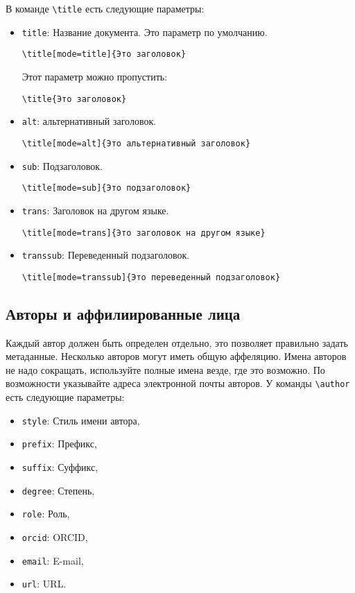 \documentclass[
12pt,
polyglossia,   %
firacode,    %
wordmath,      %
russian        %
]{isdctart}
\begin{document}
В команде \verb|\title| есть следующие параметры:
\begin{itemize}
\item \verb|title|: Название документа. Это параметр по умолчанию.
\begin{verbatim}
\title[mode=title]{Это заголовок}
\end{verbatim}
Этот параметр можно пропустить:
\begin{verbatim}
\title{Это заголовок}
\end{verbatim}
\item \verb|alt|: альтернативный заголовок.
\begin{verbatim}
\title[mode=alt]{Это альтернативный заголовок}
\end{verbatim}
\item \verb|sub|: Подзаголовок.
\begin{verbatim}
\title[mode=sub]{Это подзаголовок}
\end{verbatim}
\item \verb|trans|: Заголовок на другом языке.
\begin{verbatim}
\title[mode=trans]{Это заголовок на другом языке}
\end{verbatim}
\item \verb|transsub|: Переведенный подзаголовок.
\begin{verbatim}
\title[mode=transsub]{Это переведенный подзаголовок}
\end{verbatim}
\end{itemize}

\subsection{Авторы и аффилиированные лица}

Каждый автор должен быть определен отдельно, это позволяет правильно задать метаданные. Несколько авторов могут иметь общую аффеляцию. Имена авторов не надо сокращать, используйте полные имена везде, где это возможно. По возможности указывайте адреса электронной почты авторов.  У команды \verb|\author| есть следующие параметры:

\begin{itemize}
\item \verb|style|: Стиль имени автора,
\item \verb|prefix|: Префикс,
\item \verb|suffix|: Суффикс,
\item \verb|degree|: Степень,
\item \verb|role|: Роль,
\item \verb|orcid|: ORCID,
\item \verb|email|: E-mail,
\item \verb|url|: URL.
\end{itemize}
\end{document}
